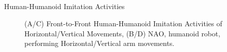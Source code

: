 \subsection{}
{

\begin{frame}{Human-Humanoid Imitation Activities}
    \begin{figure}
	\caption[PA]{(A/C) Front-to-Front Human-Humanoid Imitation 
		Activities of Horizontal/Vertical Movements,
		(B/D) NAO, humanoid robot, performing 
		Horizontal/Vertical arm movements.
		}
   \end{figure}
	
\end{frame}
}


